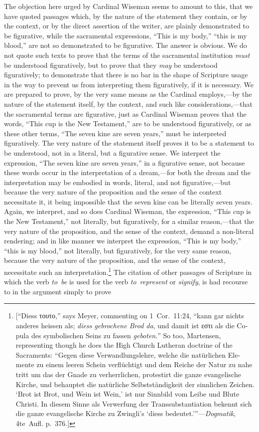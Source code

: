 \documentclass[
  english,
]{book}
\newcommand{\textgreek}[2][]{\foreignlanguage{greek}{#2}}
\newcommand{\textgerman}[2][]{\foreignlanguage{ngerman}{#2}}
\begin{document}
The objection here urged by Cardinal Wiseman seems to amount to this, that we have quoted passages which, by the nature of the statement they contain, or by the context, or by the direct assertion of the writer, are plainly demonstrated to be figurative, while the sacramental expressions, ``This is my body,'' ``this is my blood,'' are not so demonstrated to be figurative. The answer is obvious. We do not quote such texts to prove that the terms of the sacramental institution \emph{must} be understood figuratively, but to prove that they \emph{may} be understood figuratively; to demonstrate that there is no bar in the shape of Scripture usage in the way to prevent us from interpreting them figuratively, if it is necessary. We are prepared to prove, by the very same means as the Cardinal employs,---by the nature of the statement itself, by the context, and such like considerations,---that the sacramental terms are figurative, just as Cardinal Wiseman proves that the words, ``This cup is the New Testament,'' are to be understood figuratively, or as these other terms, ``The seven kine are seven years,'' must be interpreted figuratively. The very nature of the statement itself proves it to be a statement to be understood, not in a literal, but a figurative sense. We interpret the expression, ``The seven kine are seven years,'' in a figurative sense, not because these words occur in the interpretation of a dream,---for both the dream and the interpretation may be embodied in words, literal, and not figurative,---but because the very nature of the proposition and the sense of the context necessitate it, it being impossible that the seven kine can be literally seven years. Again, we interpret, and so does Cardinal Wiseman, the expression, ``This cup is the New Testament,'' not literally, but figuratively, for a similar reason,---that the very nature of the proposition, and the sense of the context, demand a non-literal rendering; and in like manner we interpret the expression, ``This is my body,'' ``this is my blood,'' not literally, but figuratively, for the very same reason, because the very nature of the proposition, and the sense of the context, necessitate such an interpretation.\footnote{{[}``\textgerman{Diess \textgreek{τουτο}},'' says Meyer, commenting on 1~Cor.~11:24, ``\textgerman{kann gar nichts anderes heissen als; \emph{diess gebrochene Brod da}, und damit ist \textgreek{εστι} als die Copula des symbolischen Seins zu fassen \emph{geboten}.}'' So too, Martensen, representing though he does the High Church Lutheran doctrine of the Sacraments: ``\textgerman{Gegen diese Verwandlungslehre, welche die natürlichen Elemente zu einem leeren Schein verflüchtigt und dem Reiche der Natur zu nahe tritt um das der Gnade zu verherrlichen, protestirt die ganze evangelische Kirche, und behauptet die natürliche Selbstständigkeit der sinnlichen Zeichen. `Brot ist Brot, und Wein ist Wein,' ist nur Sinnbild vom Leibe und Blute Christi. In diesem Sinne als Verwerfung der Transsubstantiation bekennt sich die ganze evangelische Kirche zu Zwingli's `diess bedeutet.'}''---\emph{Dogmatik}, 4te~Aufl. p.~376.{]}} The citation of other passages of Scripture in which the verb \emph{to~be} is used for the verb \emph{to~represent} or \emph{signify}, is had recourse to in the argument simply to prove 
\end{document}
